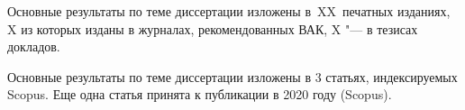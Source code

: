 {%
    {\publications} Основные результаты по теме диссертации изложены
    в~XX~печатных изданиях,
    X из которых изданы в журналах, рекомендованных ВАК,
    X "--- в тезисах докладов.
}%
{%
    \begin{refsection}
        
        \nocite{intracoh, popov_hier, bulatov2020topicnet, thetaless, prog_cook, prog_view}


    \end{refsection}%
}
{\publications} Основные результаты по теме диссертации изложены в 3 статьях, индексируемых Scopus.
Еще одна статья \cite{thetaless} принята к публикации в 2020 году (Scopus).


